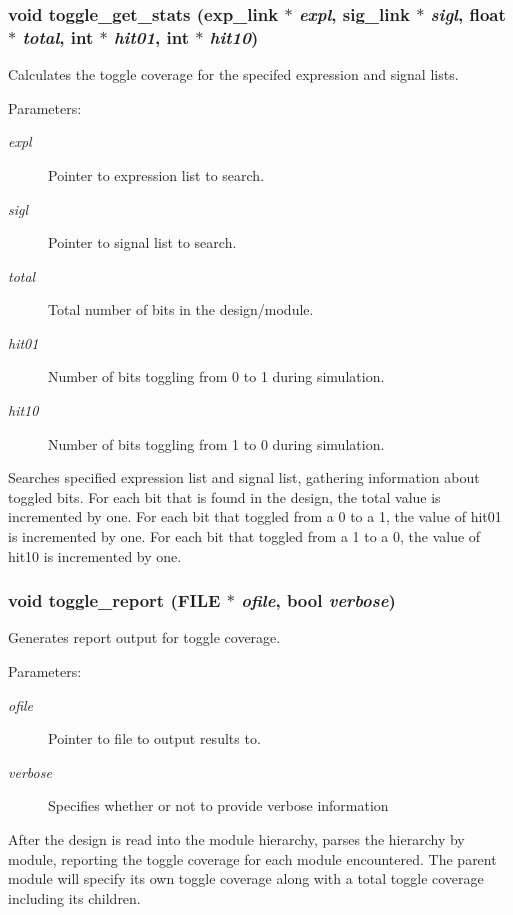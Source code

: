 \subsubsection{\setlength{\rightskip}{0pt plus 5cm}void toggle\_\-get\_\-stats ({\bf exp\_\-link} $\ast$ {\em expl}, {\bf sig\_\-link} $\ast$ {\em sigl}, float $\ast$ {\em total}, int $\ast$ {\em hit01}, int $\ast$ {\em hit10})}\label{toggle_8h_a0}


Calculates the toggle coverage for the specifed expression and signal lists.

\begin{Desc}
\item[Parameters:]
\begin{description}
\item[{\em expl}]Pointer to expression list to search. \item[{\em sigl}]Pointer to signal list to search. \item[{\em total}]Total number of bits in the design/module. \item[{\em hit01}]Number of bits toggling from 0 to 1 during simulation. \item[{\em hit10}]Number of bits toggling from 1 to 0 during simulation.\end{description}
\end{Desc}
Searches specified expression list and signal list, gathering information about toggled bits. For each bit that is found in the design, the total value is incremented by one. For each bit that toggled from a 0 to a 1, the value of hit01 is incremented by one. For each bit that toggled from a 1 to a 0, the value of hit10 is incremented by one. 
\subsubsection{\setlength{\rightskip}{0pt plus 5cm}void toggle\_\-report (FILE $\ast$ {\em ofile}, {\bf bool} {\em verbose})}\label{toggle_8h_a1}


Generates report output for toggle coverage.

\begin{Desc}
\item[Parameters:]
\begin{description}
\item[{\em ofile}]Pointer to file to output results to. \item[{\em verbose}]Specifies whether or not to provide verbose information\end{description}
\end{Desc}
After the design is read into the module hierarchy, parses the hierarchy by module, reporting the toggle coverage for each module encountered. The parent module will specify its own toggle coverage along with a total toggle coverage including its children. 